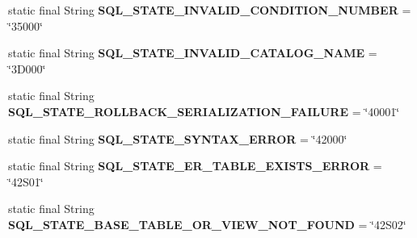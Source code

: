 \begin{DoxyCompactItemize}
\item 
\mbox{\label{classcom_1_1mysql_1_1cj_1_1exceptions_1_1_mysql_error_numbers_a66c470fed9fb930eb01e67e298e38f14}} 
static final String {\bfseries S\+Q\+L\+\_\+\+S\+T\+A\+T\+E\+\_\+\+I\+N\+V\+A\+L\+I\+D\+\_\+\+C\+O\+N\+D\+I\+T\+I\+O\+N\+\_\+\+N\+U\+M\+B\+ER} = \char`\"{}35000\char`\"{}
\item 
\mbox{\label{classcom_1_1mysql_1_1cj_1_1exceptions_1_1_mysql_error_numbers_a312b0bcb31d540660f0d829cd9ad07ba}} 
static final String {\bfseries S\+Q\+L\+\_\+\+S\+T\+A\+T\+E\+\_\+\+I\+N\+V\+A\+L\+I\+D\+\_\+\+C\+A\+T\+A\+L\+O\+G\+\_\+\+N\+A\+ME} = \char`\"{}3\+D000\char`\"{}
\item 
\mbox{\label{classcom_1_1mysql_1_1cj_1_1exceptions_1_1_mysql_error_numbers_aedc2e64a5b91f2cf178f331a658dd5a7}} 
static final String {\bfseries S\+Q\+L\+\_\+\+S\+T\+A\+T\+E\+\_\+\+R\+O\+L\+L\+B\+A\+C\+K\+\_\+\+S\+E\+R\+I\+A\+L\+I\+Z\+A\+T\+I\+O\+N\+\_\+\+F\+A\+I\+L\+U\+RE} = \char`\"{}40001\char`\"{}
\item 
\mbox{\label{classcom_1_1mysql_1_1cj_1_1exceptions_1_1_mysql_error_numbers_afc7f862bb5494ce561a962f031582c85}} 
static final String {\bfseries S\+Q\+L\+\_\+\+S\+T\+A\+T\+E\+\_\+\+S\+Y\+N\+T\+A\+X\+\_\+\+E\+R\+R\+OR} = \char`\"{}42000\char`\"{}
\item 
\mbox{\label{classcom_1_1mysql_1_1cj_1_1exceptions_1_1_mysql_error_numbers_a05e2b9deb64738400684ba12855f4ff5}} 
static final String {\bfseries S\+Q\+L\+\_\+\+S\+T\+A\+T\+E\+\_\+\+E\+R\+\_\+\+T\+A\+B\+L\+E\+\_\+\+E\+X\+I\+S\+T\+S\+\_\+\+E\+R\+R\+OR} = \char`\"{}42\+S01\char`\"{}
\item 
\mbox{\label{classcom_1_1mysql_1_1cj_1_1exceptions_1_1_mysql_error_numbers_afd03e95da83159ffb300ea6c2e73ef26}} 
static final String {\bfseries S\+Q\+L\+\_\+\+S\+T\+A\+T\+E\+\_\+\+B\+A\+S\+E\+\_\+\+T\+A\+B\+L\+E\+\_\+\+O\+R\+\_\+\+V\+I\+E\+W\+\_\+\+N\+O\+T\+\_\+\+F\+O\+U\+ND} = \char`\"{}42\+S02\char`\"{}

\end{DoxyCompactItemize}
